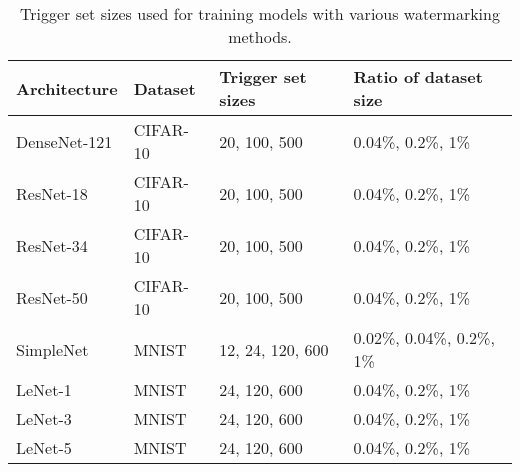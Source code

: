 \begin{table}
\small
    \centering
    \caption{Trigger set sizes used for training models with various watermarking methods.}
    \begin{tabular}{|l|l|l|l|}
        \hline
        \textbf{Architecture} & \textbf{Dataset} & \textbf{Trigger set sizes} & \textbf{Ratio of dataset size}\\
        \hline
        DenseNet-121 & CIFAR-10 & 20, 100, 500 & 0.04\%, 0.2\%, 1\% \\
        \hline
        ResNet-18 & CIFAR-10 & 20, 100, 500 & 0.04\%, 0.2\%, 1\% \\
        \hline
        ResNet-34 & CIFAR-10 & 20, 100, 500 & 0.04\%, 0.2\%, 1\% \\
        \hline
        ResNet-50 & CIFAR-10 & 20, 100, 500  & 0.04\%, 0.2\%, 1\% \\
        \hline
        SimpleNet & MNIST & 12, 24, 120, 600 & 0.02\%, 0.04\%, 0.2\%, 1\% \\
        \hline
        LeNet-1 & MNIST & 24, 120, 600 & 0.04\%, 0.2\%, 1\% \\
        \hline
        LeNet-3 & MNIST & 24, 120, 600 & 0.04\%, 0.2\%, 1\% \\
        \hline
        LeNet-5 & MNIST & 24, 120, 600 & 0.04\%, 0.2\%, 1\% \\
        \hline
    \end{tabular}
    \label{tab:trg_set_sizes}
\end{table}